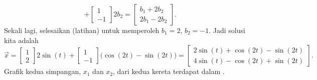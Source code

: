 \begin{example}
\begin{equation*}
+
\begin{bmatrix} 1 \\ -1 \end{bmatrix}
2 b_2
=
\begin{bmatrix} b_1+2b_2 \\ 2b_1-2b_2 \end{bmatrix} .
\end{equation*}
Sekali lagi, selesaikan (latihan) untuk memperoleh $b_1 = 2$, $b_2 = -1$.  Jadi solusi kita adalah
\begin{equation*}
\vec{x} = 
\begin{bmatrix} 1 \\ 2 \end{bmatrix}
2 \sin (t)
+
\begin{bmatrix} 1 \\ -1 \end{bmatrix}
\bigl( \cos (2t) - \sin (2t) \bigr)
=
\begin{bmatrix}
2 \sin (t) + \cos(2t)- \sin(2t) \\
4 \sin (t) - \cos(2t) + \sin(2t)
\end{bmatrix} .
\end{equation*}
Grafik kedua simpangan, $x_1$ dan $x_2$, dari kedua kereta terdapat dalam
.
\begin{myfig}
\capstart
{}
\caption{Superposisi kedua modus berdasarkan syarat
awal yang diberikan.\label{sosa:superposfig}}
\end{myfig}
\end{example}

